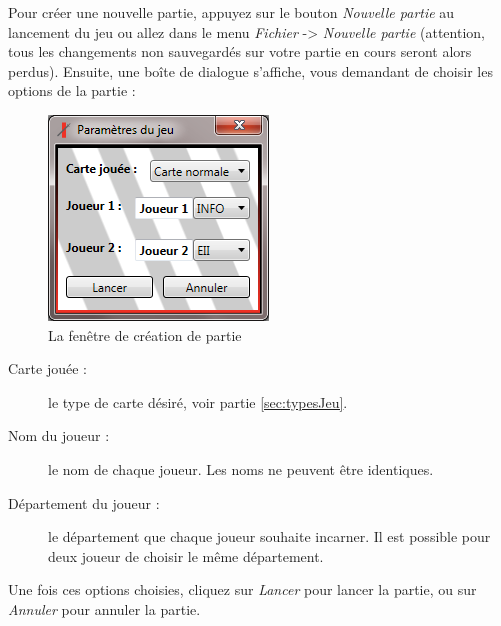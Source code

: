 Pour créer une nouvelle partie, appuyez sur le bouton \emph{Nouvelle partie} au lancement du jeu ou allez dans le menu \emph{Fichier} -> \emph{Nouvelle partie} (attention, tous les changements non sauvegardés sur votre partie en cours seront alors perdus).
Ensuite, une boîte de dialogue s'affiche, vous demandant de choisir les options de la partie :

\begin{figure}[!h]
\centering
\includegraphics{Parties/Images/CreationPartie.png}
\caption{La fenêtre de création de partie}
\label{fig:CreationPartie}
\end{figure}

\begin{description}
	\item[Carte jouée :] le type de carte désiré, voir partie \ref{sec:typesJeu}.

	\item[Nom du joueur :] le nom de chaque joueur. Les noms ne peuvent être identiques.

	\item[Département du joueur :] le département que chaque joueur souhaite incarner. Il est possible pour deux joueur de choisir le même département.
\end{description}

Une fois ces options choisies, cliquez sur \emph{Lancer} pour lancer la partie, ou sur \emph{Annuler} pour annuler la partie.